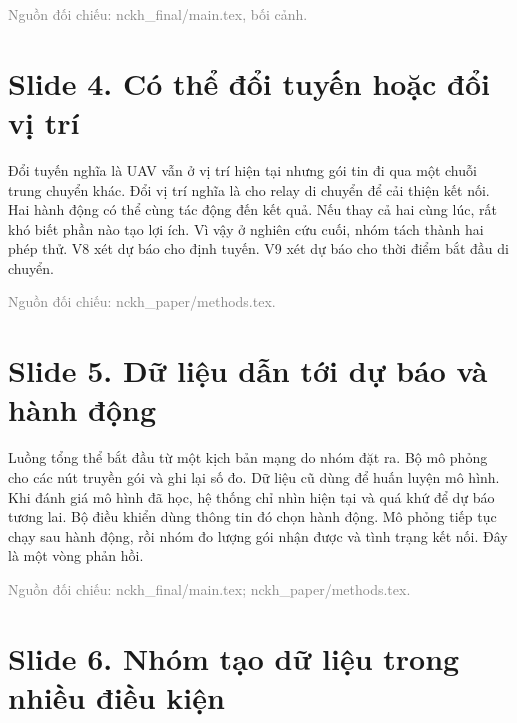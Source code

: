 {\small\textcolor{gray}{Nguồn đối chiếu: nckh\_final/main.tex, bối cảnh.}}




\section*{Slide 4. Có thể đổi tuyến hoặc đổi vị trí}


Đổi tuyến nghĩa là UAV vẫn ở vị trí hiện tại nhưng gói tin đi qua một chuỗi trung chuyển khác. Đổi vị trí nghĩa là cho relay di chuyển để cải thiện kết nối. Hai hành động có thể cùng tác động đến kết quả. Nếu thay cả hai cùng lúc, rất khó biết phần nào tạo lợi ích. Vì vậy ở nghiên cứu cuối, nhóm tách thành hai phép thử. V8 xét dự báo cho định tuyến. V9 xét dự báo cho thời điểm bắt đầu di chuyển.

{\small\textcolor{gray}{Nguồn đối chiếu: nckh\_paper/methods.tex.}}




\section*{Slide 5. Dữ liệu dẫn tới dự báo và hành động}


Luồng tổng thể bắt đầu từ một kịch bản mạng do nhóm đặt ra. Bộ mô phỏng cho các nút truyền gói và ghi lại số đo. Dữ liệu cũ dùng để huấn luyện mô hình. Khi đánh giá mô hình đã học, hệ thống chỉ nhìn hiện tại và quá khứ để dự báo tương lai. Bộ điều khiển dùng thông tin đó chọn hành động. Mô phỏng tiếp tục chạy sau hành động, rồi nhóm đo lượng gói nhận được và tình trạng kết nối. Đây là một vòng phản hồi.

{\small\textcolor{gray}{Nguồn đối chiếu: nckh\_final/main.tex; nckh\_paper/methods.tex.}}




\section*{Slide 6. Nhóm tạo dữ liệu trong nhiều điều kiện}


